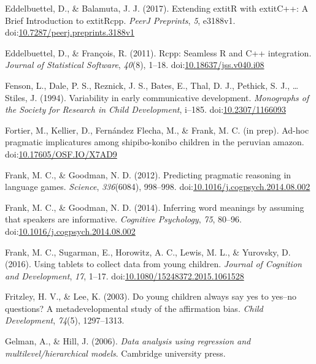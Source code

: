 \documentclass[man]{apa6}
\theoremstyle{definition}
\theoremstyle{definition}
\theoremstyle{definition}
\theoremstyle{remark}
\begin{document}
\hypertarget{ref-R-Rcpp_b}{}
Eddelbuettel, D., \& Balamuta, J. J. (2017). Extending extitR with
extitC++: A Brief Introduction to extitRcpp. \emph{PeerJ Preprints},
\emph{5}, e3188v1.
doi:\href{https://doi.org/10.7287/peerj.preprints.3188v1}{10.7287/peerj.preprints.3188v1}

\hypertarget{ref-R-Rcpp_a}{}
Eddelbuettel, D., \& François, R. (2011). Rcpp: Seamless R and C++
integration. \emph{Journal of Statistical Software}, \emph{40}(8),
1--18.
doi:\href{https://doi.org/10.18637/jss.v040.i08}{10.18637/jss.v040.i08}

\hypertarget{ref-fenson1994}{}
Fenson, L., Dale, P. S., Reznick, J. S., Bates, E., Thal, D. J.,
Pethick, S. J., \ldots{} Stiles, J. (1994). Variability in early
communicative development. \emph{Monographs of the Society for Research
in Child Development}, i--185.
doi:\href{https://doi.org/10.2307/1166093}{10.2307/1166093}

\hypertarget{ref-fortierunderrev}{}
Fortier, M., Kellier, D., Fernández Flecha, M., \& Frank, M. C. (in
prep). Ad-hoc pragmatic implicatures among shipibo-konibo children in
the peruvian amazon.
doi:\href{https://doi.org/10.17605/OSF.IO/X7AD9}{10.17605/OSF.IO/X7AD9}

\hypertarget{ref-frank2012}{}
Frank, M. C., \& Goodman, N. D. (2012). Predicting pragmatic reasoning
in language games. \emph{Science}, \emph{336}(6084), 998--998.
doi:\href{https://doi.org/10.1016/j.cogpsych.2014.08.002}{10.1016/j.cogpsych.2014.08.002}

\hypertarget{ref-frank2014}{}
Frank, M. C., \& Goodman, N. D. (2014). Inferring word meanings by
assuming that speakers are informative. \emph{Cognitive Psychology},
\emph{75}, 80--96.
doi:\href{https://doi.org/10.1016/j.cogpsych.2014.08.002}{10.1016/j.cogpsych.2014.08.002}

\hypertarget{ref-frank2016}{}
Frank, M. C., Sugarman, E., Horowitz, A. C., Lewis, M. L., \& Yurovsky,
D. (2016). Using tablets to collect data from young children.
\emph{Journal of Cognition and Development}, \emph{17}, 1--17.
doi:\href{https://doi.org/10.1080/15248372.2015.1061528}{10.1080/15248372.2015.1061528}

\hypertarget{ref-fritzley2003young}{}
Fritzley, H. V., \& Lee, K. (2003). Do young children always say yes to
yes--no questions? A metadevelopmental study of the affirmation bias.
\emph{Child Development}, \emph{74}(5), 1297--1313.

\hypertarget{ref-gelman2006data}{}
Gelman, A., \& Hill, J. (2006). \emph{Data analysis using regression and
multilevel/hierarchical models}. Cambridge university press.
\end{document}
